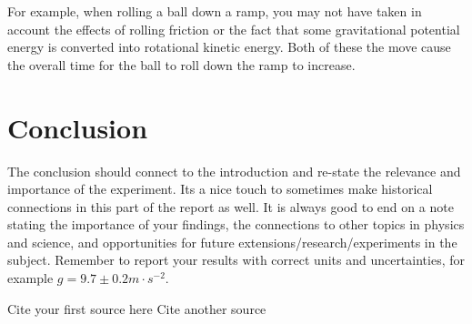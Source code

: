 \documentclass[12pt]{article}
\begin{document}
For example, when rolling a ball down a ramp, you may not have taken in account the effects of rolling friction or the fact that some gravitational potential energy is converted into rotational kinetic energy. Both of these the move cause the overall time for the ball to roll down the ramp to increase.


\section{Conclusion}
    The conclusion should connect to the introduction and re-state the relevance and importance of the experiment. Its a nice touch to sometimes make historical connections in this part of the report as well. It is always good to end on a note stating the importance of your findings, the connections to other topics in physics and science, and opportunities for future extensions/research/experiments in the subject. Remember to report your results with correct units and uncertainties, for example $g=9.7 \pm 0.2 m \cdotp s^{-2}$. 
    

\begin{thebibliography}{0}

	
	 Cite your first source here
	 Cite another source
	
\end{thebibliography}
    





\end{document}

